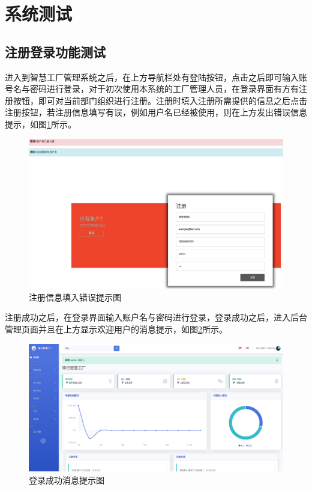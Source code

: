 \section{系统测试}

\subsection{注册登录功能测试}

进入到智慧工厂管理系统之后，在上方导航栏处有登陆按钮，点击之后即可输入账号名与密码进行登录，对于初次使用本系统的工厂管理人员，在登录界面有方有注册按钮，即可对当前部门组织进行注册。注册时填入注册所需提供的信息之后点击注册按钮，若注册信息填写有误，例如用户名已经被使用，则在上方发出错误信息提示，如图\ref{fig:rgster}所示。

\begin{figure}[H]
    \centering
    \includegraphics[width=.75\textwidth]{figures/6registererror.png}
    \caption{注册信息填入错误提示图}
    \label{fig:rgster}
\end{figure}

注册成功之后，在登录界面输入账户名与密码进行登录，登录成功之后，进入后台管理页面并且在上方显示欢迎用户的消息提示，如图\ref{fig:lgsccs}所示。

\begin{figure}[H]
    \centering
    \includegraphics[width=.75\textwidth]{figures/6loginsuscess.png}
    \caption{登录成功消息提示图}
    \label{fig:lgsccs}
\end{figure}


